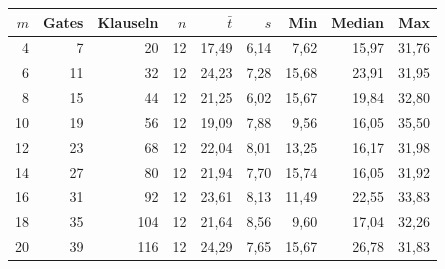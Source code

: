 \begin{tabular}{rrrrrrrrr}
\toprule
$m$ & Gates & Klauseln & $n$ & $\bar{t}$ & $s$ & Min & Median & Max \\
\midrule
4 & 7 & 20 & 12 & 17,49 & 6,14 & 7,62 & 15,97 & 31,76 \\
6 & 11 & 32 & 12 & 24,23 & 7,28 & 15,68 & 23,91 & 31,95 \\
8 & 15 & 44 & 12 & 21,25 & 6,02 & 15,67 & 19,84 & 32,80 \\
10 & 19 & 56 & 12 & 19,09 & 7,88 & 9,56 & 16,05 & 35,50 \\
12 & 23 & 68 & 12 & 22,04 & 8,01 & 13,25 & 16,17 & 31,98 \\
14 & 27 & 80 & 12 & 21,94 & 7,70 & 15,74 & 16,05 & 31,92 \\
16 & 31 & 92 & 12 & 23,61 & 8,13 & 11,49 & 22,55 & 33,83 \\
18 & 35 & 104 & 12 & 21,64 & 8,56 & 9,60 & 17,04 & 32,26 \\
20 & 39 & 116 & 12 & 24,29 & 7,65 & 15,67 & 26,78 & 31,83 \\
\bottomrule
\end{tabular}
